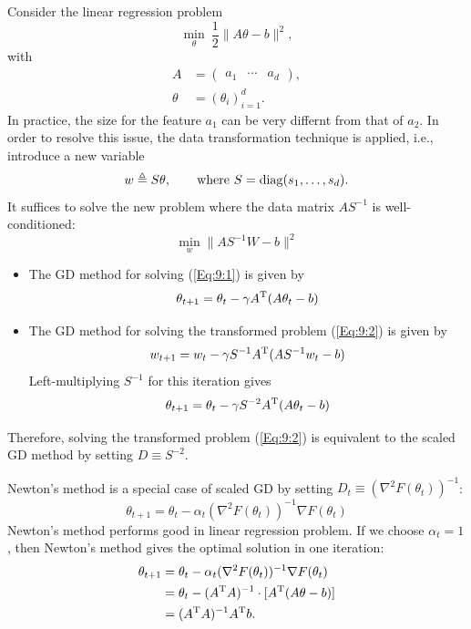 \begin{example}
Consider the linear regression problem
\begin{equation}\label{Eq:9:1}
\min_{\theta}~\frac{1}{2}\|A\theta - b\|^2,
\end{equation}
with 
\begin{align*}
A&=\begin{pmatrix}
a_1&\cdots&a_d
\end{pmatrix},\\
\theta &= (\theta_i)_{i=1}^d.
\end{align*}
In practice, the size for the feature $a_1$ can be very differnt from that of $a_2$.
In order to resolve this issue, the data transformation technique is applied, i.e., 
introduce a new variable
\[
w \triangleq S\theta,\qquad\text{where }S=\operatorname{diag}(s_1,\dots,s_d).
\]
It suffices to solve the new problem where the data matrix $AS^{-1}$ is well-conditioned:
\begin{equation}\label{Eq:9:2}
\min_{w}\|A S^{-1}W - b\|^2
\end{equation}
\begin{itemize}
\item
The GD method for solving (\ref{Eq:9:1}) is given by
\[
\theta_{t+1} = \theta_t - \gamma A^{\mathrm T} (A\theta_t -b)
\]
\item
The GD method for solving the transformed problem (\ref{Eq:9:2}) is given by
\[
w_{t+1}  =w_t - \gamma S^{-1}A^{\mathrm T}(AS^{-1}w_t - b)
\]
Left-multiplying $S^{-1}$ for this iteration gives
\[
\theta_{t+1} = \theta_t - \gamma S^{-2}A^{\mathrm T} (A\theta_t - b)
\]
\end{itemize}
Therefore, solving the transformed problem (\ref{Eq:9:2}) is equivalent to the scaled GD method by setting $D\equiv S^{-2}$.
\end{example}

\begin{example}
Newton's method is a special case of scaled GD by setting $D_t\equiv (\nabla^2 F(\theta_t))^{-1}$:
\[
\theta_{t+1} = \theta_t - \alpha_t(\nabla^2 F(\theta_t))^{-1}\nabla F(\theta_t)
\]
Newton's method performs good in linear regression problem. If we choose $\alpha_t=1$, then Newton's method gives the optimal solution in one iteration:
\begin{align*}
\theta_{t+1} &= \theta_t - \alpha_t(\nabla^2 F(\theta_t))^{-1}\nabla F(\theta_t)\\
&=\theta_t - (A^{\mathrm T} A)^{-1}\cdot[A^{\mathrm T}(A\theta - b)]\\
&=(A^{\mathrm T} A)^{-1}A^{\mathrm T} b.
\end{align*}
\end{example}

